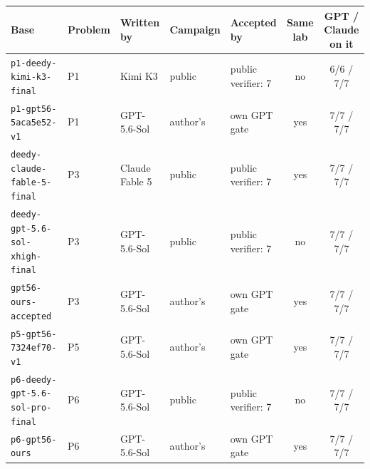 \begingroup\scriptsize\setlength{\tabcolsep}{4pt}
\begin{tabular}{@{}lllllcc@{}}
\toprule
Base & Problem & Written by & Campaign & Accepted by & Same lab & GPT / Claude on it \\
\midrule
\texttt{p1-deedy-kimi-k3-final} & P1 & Kimi K3 & public & public verifier: 7 & no & 6/6 / 7/7 \\
\texttt{p1-gpt56-5aca5e52-v1} & P1 & GPT-5.6-Sol & author's & own GPT gate & yes & 7/7 / 7/7 \\
\texttt{deedy-claude-fable-5-final} & P3 & Claude Fable 5 & public & public verifier: 7 & yes & 7/7 / 7/7 \\
\texttt{deedy-gpt-5.6-sol-xhigh-final} & P3 & GPT-5.6-Sol & public & public verifier: 7 & no & 7/7 / 7/7 \\
\texttt{gpt56-ours-accepted} & P3 & GPT-5.6-Sol & author's & own GPT gate & yes & 7/7 / 7/7 \\
\texttt{p5-gpt56-7324ef70-v1} & P5 & GPT-5.6-Sol & author's & own GPT gate & yes & 7/7 / 7/7 \\
\texttt{p6-deedy-gpt-5.6-sol-pro-final} & P6 & GPT-5.6-Sol & public & public verifier: 7 & no & 7/7 / 7/7 \\
\texttt{p6-gpt56-ours} & P6 & GPT-5.6-Sol & author's & own GPT gate & yes & 7/7 / 7/7 \\
\bottomrule
\end{tabular}
\endgroup
